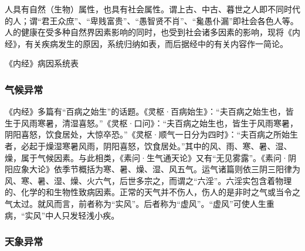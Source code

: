 \documentclass[12pt]{ctexbook}
\begin{document}
人具有自然（生物）属性，也具有社会属性。谓上古、中古、暮世之人即不同时代的人；谓“君王众庶”、“卑贱富贵”、“愚智贤不肖”、“毚愚仆漏”即社会各色人等。人的健康在受多种自然界因素影响的同时，也受到社会诸多因素的影响，现将《内经》，有关疾病发生的原因，系统归纳如表，而后据经中的有关内容作一简论。

{
	\small\centerline{《内经》病因系统表}\smallskip
	\label{fig:《内经》病因系统表}
	\renewcommand{\baselinestretch}{1}
	\hspace{.1\textwidth}%
	\hfill
}

\subsubsection{气候异常}%

《内经》多篇有“百病之始生”的话题。《灵枢·百病始生》：“夫百病之始生也，皆生于风雨寒暑，清湿喜怒。”《灵枢·口问》：“夫百病之始生也，皆生于风雨寒暑，阴阳喜怒，饮食居处，大惊卒恐。”《灵枢·顺气一日分为四时》：“夫百病之所始生者，必起于燥湿寒暑风雨，阴阳喜怒，饮食居处。”其中的风、雨、寒、暑、湿、燥，属于气候因素。与此相类，《素问·生气通天论》又有“无见雾露”。《素问·阴阳应象大论》依季节概括为寒、暑、燥、湿、风五气。运气诸篇则依三阴三阳律为风、寒、暑、湿、燥、火六气，后世多宗之，而谓之“六淫”。六淫实包含着物理的、化学的和生物性致病因素。正常的天气并不伤人，伤人的是非时之气或当令之气太过。就风而言，前者称为“实风”。后者称为“虚风”。“虚风”可使人生重病，“实风”中人只发轻浅小疾。

\subsubsection{天象异常}%
\end{document}

